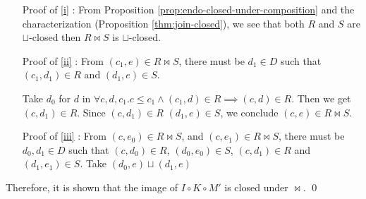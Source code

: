 \documentclass{llncs}
\newcommand{\fb}{{f^{\leftarrow}}}
\newcommand{\gb}{{g^{\leftarrow}}}
\newcommand{\join}{\sqcup}
\newcommand{\bigjoin}{\bigsqcup}
\newcommand{\comp}{\circ}
\newcommand{\bowtielift}{\mathbin{\overline{\bowtie}}}
\begin{document}
\begin{enumerate}[i]
\item[Proof of \ref{i}]:
From Proposition \ref{prop:endo-closed-under-composition} and the characterization (Proposition \ref{thm:join-closed}), we see that both $R$ and $S$ are $\join$-closed then $R \bowtie S$ is $\join$-closed.

\item[Proof of \ref{ii}]:
From $(c_{1} , e) \in R \bowtie S$, there must be $d_1 \in D$ such that $(c_{1} , d_{1}) \in R$ and $(d_{1} , e) \in S$.

Take $d_{0}$ for $d$ in $\forall c, d , c_{1}. c \leq c_{1} \land (c_{1} , d) \in R \implies (c , d) \in R$.
Then we get $(c, d_{1}) \in R$. Since $(c , d_{1}) \in R$ $(d_{1} , e) \in S$, we conclude $(c , e) \in R \bowtie S$.

\item[Proof of \ref{iii}]:
From $(c , e_{0}) \in R \bowtie S$, and $(c , e_{1}) \in R \bowtie S$, there must be $d_{0}, d_1 \in D$ such that $(c , d_{0}) \in R$, $(d_{0}, e_{0}) \in S$, $(c, d_{1}) \in R$ and $(d_{1}, e_{1}) \in S$.
Take $(d_{0}, e) \join (d_{1}, e)$




%
\end{enumerate}
Therefore, it is shown that the image of $I \comp K \comp M'$ is closed under $\bowtie$. \qed
\end{document}
